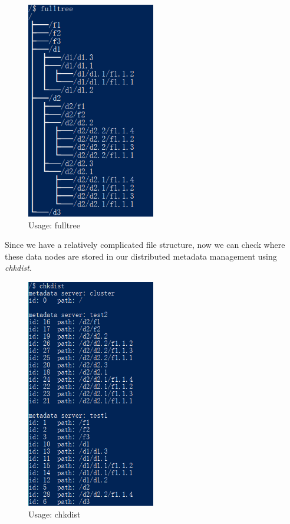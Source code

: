 \documentclass[10pt]{article}
\begin{document}
\begin{figure}[H]
\centerline{\includegraphics[width = 0.5\textwidth]{images//3 fulltree.png}}
\caption{Usage: fulltree}
\end{figure}

Since we have a relatively complicated file structure, now we can check where these 
data nodes are stored in our distributed metadata management using \textit{chkdist}.

\begin{figure}[H]
\centerline{\includegraphics[width = 0.5\textwidth]{images//5 chkdist.png}}
\caption{Usage: chkdist}
\end{figure}
\end{document}
